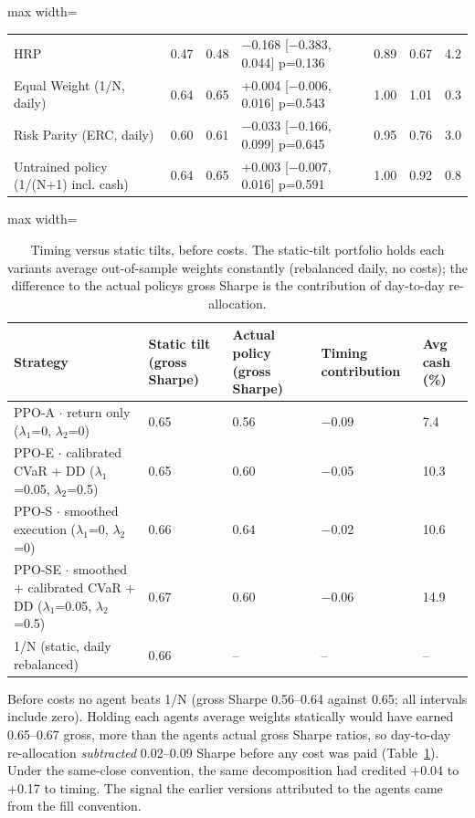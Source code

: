 \documentclass[11pt]{article}
\begin{document}
\begin{table}[!htbp]
\begin{adjustbox}{max width=\linewidth}
\begin{tabular}{@{}lllllll@{}}
HRP & 0.47 & 0.48 & $-$0.168 {[}$-$0.383, 0.044{]} p=0.136 & 0.89 & 0.67 & 4.2 \\
Equal Weight (1/N, daily) & 0.64 & 0.65 & +0.004 {[}$-$0.006, 0.016{]} p=0.543 & 1.00 & 1.01 & 0.3 \\
Risk Parity (ERC, daily) & 0.60 & 0.61 & $-$0.033 {[}$-$0.166, 0.099{]} p=0.645 & 0.95 & 0.76 & 3.0 \\
Untrained policy (1/(N+1) incl. cash) & 0.64 & 0.65 & +0.003 {[}$-$0.007, 0.016{]} p=0.591 & 1.00 & 0.92 & 0.8 \\
\bottomrule
\end{tabular}
\end{adjustbox}
\end{table}

\begin{table}[!htbp]
\centering\scriptsize
\caption{Timing versus static tilts, before costs. The static-tilt portfolio holds each variant\textquotesingle s average out-of-sample weights constantly (rebalanced daily, no costs); the difference to the actual policy\textquotesingle s gross Sharpe is the contribution of day-to-day re-allocation.\label{tab-timing-no}}
\begin{adjustbox}{max width=\linewidth}
\begin{tabular}{@{}lllll@{}}
\toprule
Strategy & Static tilt (gross Sharpe) & Actual policy (gross Sharpe) & Timing contribution & Avg cash (\%) \\
\midrule
PPO-A $\cdot$ return only {($\lambda_1$=0, $\lambda_2$=0)} & 0.65 & 0.56 & $-$0.09 & 7.4 \\
PPO-E $\cdot$ calibrated CVaR + DD {($\lambda_1$=0.05, $\lambda_2$=0.5)} & 0.65 & 0.60 & $-$0.05 & 10.3 \\
PPO-S $\cdot$ smoothed execution {($\lambda_1$=0, $\lambda_2$=0)} & 0.66 & 0.64 & $-$0.02 & 10.6 \\
PPO-SE $\cdot$ smoothed + calibrated CVaR + DD {($\lambda_1$=0.05, $\lambda_2$=0.5)} & 0.67 & 0.60 & $-$0.06 & 14.9 \\
1/N (static, daily rebalanced) & 0.66 & -- & -- & -- \\
\bottomrule
\end{tabular}
\end{adjustbox}
\end{table}

Before costs no agent beats 1/N (gross Sharpe 0.56--0.64 against 0.65; all intervals include zero). Holding each agent\textquotesingle s average weights statically would have earned 0.65--0.67 gross, more than the agents\textquotesingle{} actual gross Sharpe ratios, so day-to-day re-allocation \emph{subtracted} 0.02--0.09 Sharpe before any cost was paid (Table~\ref{tab-timing-no}). Under the same-close convention, the same decomposition had credited +0.04 to +0.17 to timing. The signal the earlier versions attributed to the agents came from the fill convention.
\end{document}
